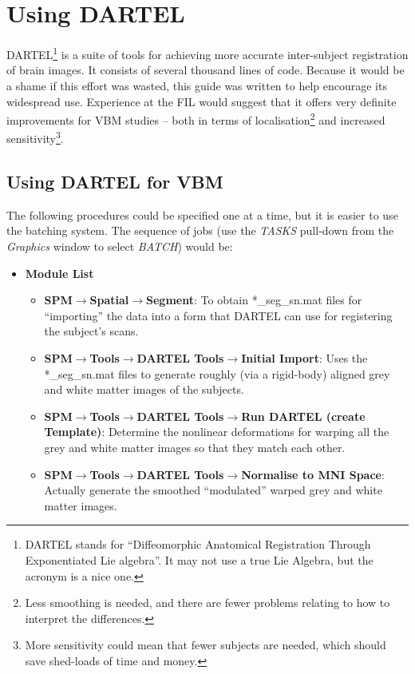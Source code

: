 \chapter{Using DARTEL \label{Chap:dartelguide}}

DARTEL\footnote{DARTEL stands for ``Diffeomorphic Anatomical Registration Through Exponentiated Lie algebra''.
It may not use a true Lie Algebra, but the acronym is a nice one.} is a suite of tools for achieving more accurate inter-subject registration of brain images.
It consists of several thousand lines of code. Because it would be a shame if this effort was wasted, this guide was written to help encourage its widespread use.
Experience at the FIL would suggest that it offers very definite improvements for VBM studies -- both in terms of localisation\footnote{Less smoothing is needed, and there are fewer problems relating to how to interpret the differences.} and increased sensitivity\footnote{More sensitivity could mean that fewer subjects are needed, which should save shed-loads of time and money.}.



\section{Using DARTEL for VBM \label{Sec:dartel_vbm}}
The following procedures could be specified one at a time, but it is easier to use the batching system.
The sequence of jobs (use the \emph{TASKS} pull-down from the \emph{Graphics} window to select \emph{BATCH}) would be:
\begin{itemize}
\item{{\bf Module List}
  \begin{itemize}
  \item{{\bf SPM$\rightarrow$Spatial$\rightarrow$Segment}: To obtain *\_seg\_sn.mat files for ``importing'' the data into a form that DARTEL can use for registering the subject's scans.}
  \item{{\bf SPM$\rightarrow$Tools$\rightarrow$DARTEL Tools$\rightarrow$Initial Import}: Uses the *\_seg\_sn.mat files to generate roughly (via a rigid-body) aligned grey and white matter images of the subjects.}
  \item{{\bf SPM$\rightarrow$Tools$\rightarrow$DARTEL Tools$\rightarrow$Run DARTEL (create Template)}: Determine the nonlinear deformations for warping all the grey and white matter images so that they match each other.}
  \item{{\bf SPM$\rightarrow$Tools$\rightarrow$DARTEL Tools$\rightarrow$Normalise to MNI Space}: Actually generate the smoothed ``modulated'' warped grey and white matter images.}
  \end{itemize}
}
\end{itemize}

